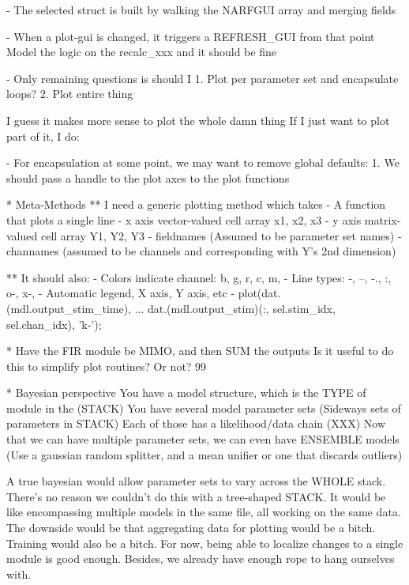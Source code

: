 {  - The selected struct is built by walking the NARFGUI array and merging fields

  - When a plot-gui is changed, it triggers a REFRESH_GUI from that point
    Model the logic on the recalc_xxx and it should be fine

  - Only remaining questions is should I
    1. Plot per parameter set and encapsulate loops?
    2. Plot entire thing

    I guess it makes more sense to plot the whole damn thing
    If I just want to plot part of it, I do: 

  - For encapsulation at some point, we may want to remove global defaults:
    1. We should pass a handle to the plot axes to the plot functions

* Meta-Methods
** I need a generic plotting method which takes
  - A function that plots a single line
  - x axis vector-valued cell array {x1, x2, x3}
  - y axis matrix-valued cell array {Y1, Y2, Y3}
  - fieldnames (Assumed to be parameter set names)
  - channames (assumed to be channels and corresponding with Y's 2nd dimension)

** It should also:
   - Colors indicate channel: b, g, r, c, m, 
   - Line types:    -, --, -., :, o-, x-,
   - Automatic legend, X axis, Y axis, etc
   - plot(dat.(mdl.output_stim_time), ...
       dat.(mdl.output_stim)(:, sel.stim_idx, sel.chan_idx), 'k-');

* Have the FIR module be MIMO, and then SUM the outputs
  Is it useful to do this to simplify plot routines? Or not?
  99%

* Bayesian perspective
  You have a model structure, which is the TYPE of module in the (STACK)
  You have several model parameter sets (Sideways sets of parameters in STACK)
  Each of those has a likelihood/data chain (XXX)
  Now that we can have multiple parameter sets, we can even have ENSEMBLE models
  (Use a gaussian random splitter, and a mean unifier or one that discards outliers)
  
A true bayesian would allow parameter sets to vary across the WHOLE stack.
There's no reason we couldn't do this with a tree-shaped STACK.
It would be like encompassing multiple models in the same file, all working on the same data.
The downside would be that aggregating data for plotting would be a bitch.
Training would also be a bitch. 
For now, being able to localize changes to a single module is good enough. 
Besides, we already have enough rope to hang ourselves with.

}

